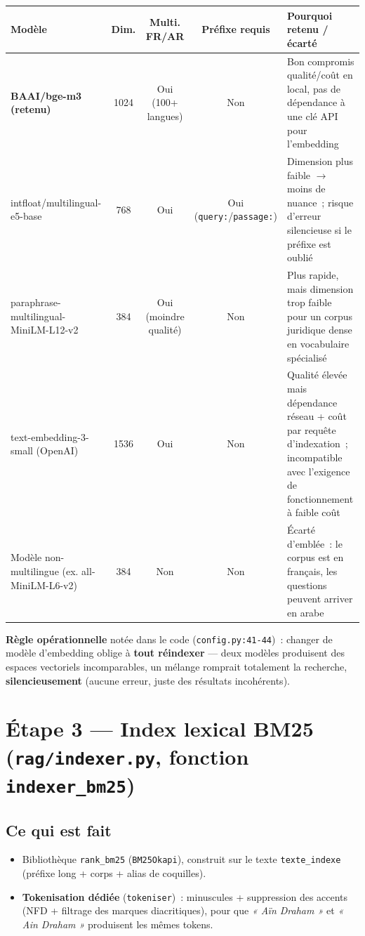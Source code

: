 \documentclass[11pt]{article}
\begin{document}
\begin{tabularx}{\textwidth}{@{}l c c c Y@{}}
\toprule
\textbf{Modèle} & \textbf{Dim.} & \textbf{Multi. FR/AR} & \textbf{Préfixe requis} & \textbf{Pourquoi retenu / écarté} \\
\midrule
\textbf{BAAI/bge-m3 (retenu)} & 1024 & Oui (100+ langues) & Non & Bon compromis qualité/coût en local, pas de dépendance à une clé API pour l'embedding \\
intfloat/multilingual-e5-base & 768 & Oui & Oui (\texttt{query:}/\texttt{passage:}) & Dimension plus faible $\rightarrow$ moins de nuance~; risque d'erreur silencieuse si le préfixe est oublié \\
paraphrase-multilingual-MiniLM-L12-v2 & 384 & Oui (moindre qualité) & Non & Plus rapide, mais dimension trop faible pour un corpus juridique dense en vocabulaire spécialisé \\
text-embedding-3-small (OpenAI) & 1536 & Oui & Non & Qualité élevée mais dépendance réseau + coût par requête d'indexation~; incompatible avec l'exigence de fonctionnement à faible coût \\
Modèle non-multilingue (ex. all-MiniLM-L6-v2) & 384 & Non & Non & Écarté d'emblée~: le corpus est en français, les questions peuvent arriver en arabe \\
\bottomrule
\end{tabularx}

\vspace{0.5em}
\textbf{Règle opérationnelle} notée dans le code (\texttt{config.py:41-44})~: changer de modèle
d'embedding oblige à \textbf{tout réindexer} --- deux modèles produisent des espaces vectoriels
incomparables, un mélange romprait totalement la recherche, \textbf{silencieusement} (aucune
erreur, juste des résultats incohérents).

\section{Étape 3 --- Index lexical BM25 (\texttt{rag/indexer.py}, fonction \texttt{indexer\_bm25})}

\subsection*{Ce qui est fait}

\begin{itemize}
  \item Bibliothèque \texttt{rank\_bm25} (\texttt{BM25Okapi}), construit sur le texte
        \texttt{texte\_indexe} (préfixe long + corps + alias de coquilles).
  \item \textbf{Tokenisation dédiée} (\texttt{tokeniser})~: minuscules + suppression des accents
        (NFD + filtrage des marques diacritiques), pour que \textit{« Aïn Draham »} et
        \textit{« Ain Draham »} produisent les mêmes tokens.
\end{itemize}
\end{document}
